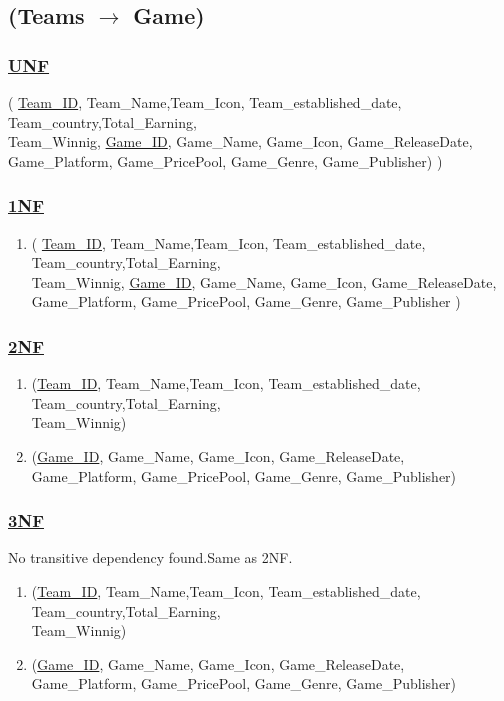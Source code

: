 \subsection{\texorpdfstring{\centering (Teams $\rightarrow$ Game)}{(Teams - Game)}}

\subsubsection*{\underline{UNF}}

(
\underline{Team\_ID}, Team\_Name,Team\_Icon, Team\_established\_date, Team\_country,Total\_Earning,\\Team\_Winnig,
\underline{Game\_ID}, Game\_Name, Game\_Icon, Game\_ReleaseDate, Game\_Platform, Game\_PricePool, Game\_Genre, Game\_Publisher)
)

\subsubsection*{\underline{1NF}}
\begin{enumerate}
    \item (
          \underline{Team\_ID}, Team\_Name,Team\_Icon, Team\_established\_date, Team\_country,Total\_Earning,\\Team\_Winnig,
          \underline{Game\_ID}, Game\_Name, Game\_Icon, Game\_ReleaseDate, Game\_Platform, Game\_PricePool, Game\_Genre, Game\_Publisher
          )
\end{enumerate}

\subsubsection*{\underline{2NF}}
\begin{enumerate}
    \item (\underline{Team\_ID}, Team\_Name,Team\_Icon, Team\_established\_date, Team\_country,Total\_Earning,\\Team\_Winnig)
    \item (\underline{Game\_ID}, Game\_Name, Game\_Icon, Game\_ReleaseDate, Game\_Platform, Game\_PricePool, Game\_Genre, Game\_Publisher)
\end{enumerate}

\subsubsection*{\underline{3NF}}
No transitive dependency found.Same as 2NF.
\begin{enumerate}
    \item (\underline{Team\_ID}, Team\_Name,Team\_Icon, Team\_established\_date, Team\_country,Total\_Earning,\\Team\_Winnig)
    \item (\underline{Game\_ID}, Game\_Name, Game\_Icon, Game\_ReleaseDate, Game\_Platform, Game\_PricePool, Game\_Genre, Game\_Publisher)
\end{enumerate}

